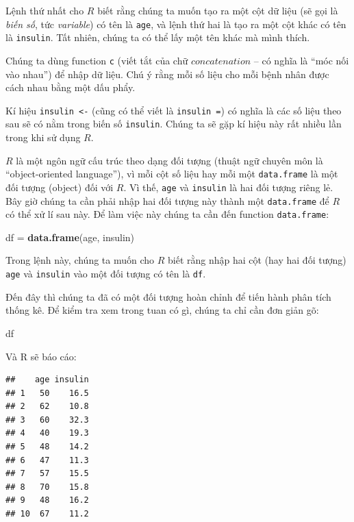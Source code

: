 \documentclass[
]{book}
\newenvironment{Shaded}{\begin{snugshade}}{\end{snugshade}}
\newcommand{\KeywordTok}[1]{\textcolor[rgb]{0.13,0.29,0.53}{\textbf{#1}}}
\newcommand{\NormalTok}[1]{#1}
\newcommand{\StringTok}[1]{\textcolor[rgb]{0.31,0.60,0.02}{#1}}
\begin{document}
Lệnh thứ nhất cho \(R\) biết rằng chúng ta muốn tạo ra một cột dữ liệu (sẽ gọi là \emph{biến số}, tức \emph{variable}) có tên là \texttt{age}, và lệnh thứ hai là tạo ra một cột khác có tên là \texttt{insulin}. Tất nhiên, chúng ta có thể lấy một tên khác mà mình thích.

Chúng ta dùng function \texttt{c} (viết tắt của chữ \(concatenation\) -- có nghĩa là ``móc nối vào nhau'') để nhập dữ liệu. Chú ý rằng mỗi số liệu cho mỗi bệnh nhân được cách nhau bằng một dấu phẩy.

Kí hiệu \texttt{insulin\ \textless{}-} (cũng có thể viết là \texttt{insulin\ =}) có nghĩa là các số liệu theo sau sẽ có nằm trong biến số \texttt{insulin}. Chúng ta sẽ gặp kí hiệu này rất nhiều lần trong khi sử dụng \(R\).

\(R\) là một ngôn ngữ cấu trúc theo dạng đối tượng (thuật ngữ chuyên môn là ``object-oriented language''), vì mỗi cột số liệu hay mỗi một \texttt{data.frame} là một đối tượng (object) đối với \(R\). Vì thế, \texttt{age} và \texttt{insulin} là hai đối tượng riêng lẻ. Bây giờ chúng ta cần phải nhập hai đối tượng này thành một \texttt{data.frame} để \(R\) có thể xử lí sau này. Để làm việc này chúng ta cần đến function \texttt{data.frame}:

\begin{Shaded}
\begin{Highlighting}[]
\NormalTok{df =}\StringTok{ }\KeywordTok{data.frame}\NormalTok{(age, insulin)}
\end{Highlighting}
\end{Shaded}

Trong lệnh này, chúng ta muốn cho \(R\) biết rằng nhập hai cột (hay hai đối tượng) \texttt{age} và \texttt{insulin} vào một đối tượng có tên là \texttt{df}.

Đến đây thì chúng ta đã có một đối tượng hoàn chỉnh để tiến hành phân tích thống kê. Để kiểm tra xem trong tuan có gì, chúng ta chỉ cần đơn giản gõ:

\begin{Shaded}
\begin{Highlighting}[]
\NormalTok{df}
\end{Highlighting}
\end{Shaded}

Và R sẽ báo cáo:

\begin{verbatim}
##    age insulin
## 1   50    16.5
## 2   62    10.8
## 3   60    32.3
## 4   40    19.3
## 5   48    14.2
## 6   47    11.3
## 7   57    15.5
## 8   70    15.8
## 9   48    16.2
## 10  67    11.2
\end{verbatim}
\end{document}
